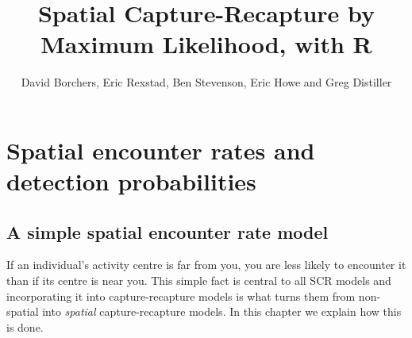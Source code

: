 \documentclass[graybox,envcountchap,sectrefs]{SpringerStyleFiles/styles/svmono}\usepackage[]{graphicx}\usepackage[]{color}
\begin{document}

\author{David Borchers, Eric Rexstad, Ben Stevenson, Eric Howe and Greg Distiller}
\title{Spatial Capture-Recapture by Maximum Likelihood, with R}
\maketitle

\frontmatter%


\tableofcontents



\mainmatter%




\chapter{Spatial encounter rates and detection probabilities}
\label{chap:ER+detfun}


\section{A simple spatial encounter rate model}
\label{sec:ER+detfun.simple.ER.model}

If an individual's activity centre is far from you, you are less likely to encounter it than if its centre is near you. This simple fact is central to all SCR models and incorporating it into capture-recapture models is what turns them from non-spatial into \textit{spatial} capture-recapture models. In this chapter we explain how this is done. 
\end{document}
